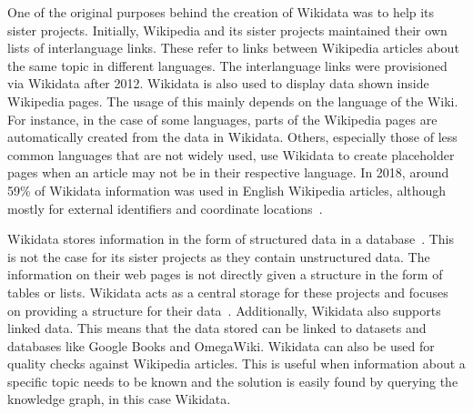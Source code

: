 One of the original purposes behind the creation of Wikidata was to help its sister projects. Initially, Wikipedia and its sister projects maintained their own lists of interlanguage links. These refer to links between Wikipedia articles about the same topic in different languages. The interlanguage links were provisioned via Wikidata after 2012. Wikidata is also used to display data shown inside Wikipedia pages. The usage of this mainly depends on the language of the Wiki. For instance, in the case of some languages, parts of the Wikipedia pages are automatically created from the data in Wikidata. Others, especially those of less common languages that are not widely used, use Wikidata to create placeholder pages when an article may not be in their respective language. In 2018, around 59\% of Wikidata information was used in English Wikipedia articles, although mostly for external identifiers and coordinate locations~\cite{Wikipedia2017}. 

Wikidata stores information in the form of structured data in a database~\cite{Tharani2021}. This is not the case for its sister projects as they contain unstructured data. The information on their web pages is not directly given a structure in the form of tables or lists. Wikidata acts as a central storage for these projects and focuses on providing a structure for their data~\cite{Wikidata2014}. Additionally, Wikidata also supports linked data. This means that the data stored can be linked to datasets and databases like Google Books and OmegaWiki. Wikidata can also be used for quality checks against Wikipedia articles. This is useful when information about a specific topic needs to be known and the solution is easily found by querying the knowledge graph, in this case Wikidata.


